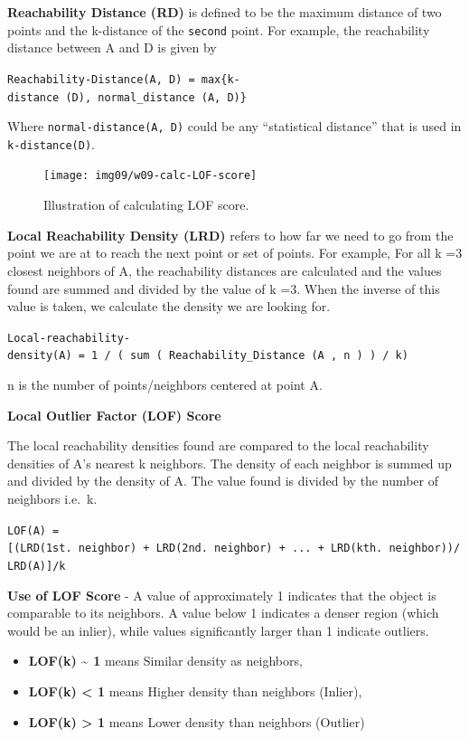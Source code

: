 \documentclass[
]{book}
\begin{document}
\textbf{Reachability Distance (RD)} is defined to be the maximum distance of two points and the k-distance of the \texttt{second} point. For example, the reachability distance between A and D is given by

\texttt{Reachability-Distance(A,\ D)\ =\ max\{k-distance\ (D),\ normal\_distance\ (A,\ D)\}}

Where \texttt{normal-distance(A,\ D)} could be any ``statistical distance'' that is used in \texttt{k-distance(D)}.

\begin{figure}

{\centering \texttt{[image: img09/w09-calc-LOF-score]} 

}

\caption{Illustration of calculating LOF score.}\label{fig:unnamed-chunk-237}
\end{figure}

\textbf{Local Reachability Density (LRD)} refers to how far we need to go from the point we are at to reach the next point or set of points. For example, For all k =3 closest neighbors of A, the reachability distances are calculated and the values found are summed and divided by the value of k =3. When the inverse of this value is taken, we calculate the density we are looking for.

\texttt{Local-reachability-density(A)\ =\ 1\ /\ (\ sum\ (\ Reachability\_Distance\ (A\ ,\ n\ )\ )\ /\ k)}

n is the number of points/neighbors centered at point A.

\textbf{Local Outlier Factor (LOF) Score}

The local reachability densities found are compared to the local reachability densities of A's nearest k neighbors. The density of each neighbor is summed up and divided by the density of A. The value found is divided by the number of neighbors i.e.~k.

\texttt{LOF(A)\ ={[}(LRD(1st.\ neighbor)\ +\ LRD(2nd.\ neighbor)\ +\ ...\ +\ LRD(kth.\ neighbor))/LRD(A){]}/k}

\textbf{Use of LOF Score} - A value of approximately 1 indicates that the object is comparable to its neighbors. A value below 1 indicates a denser region (which would be an inlier), while values significantly larger than 1 indicate outliers.

\begin{itemize}
\item
  \textbf{LOF(k) \textasciitilde{} 1} means Similar density as neighbors,
\item
  \textbf{LOF(k) \textless{} 1} means Higher density than neighbors (Inlier),
\item
  \textbf{LOF(k) \textgreater{} 1} means Lower density than neighbors (Outlier)
\end{itemize}
\end{document}
